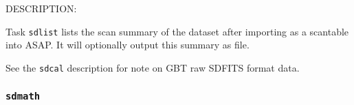 DESCRIPTION:
    
Task {\tt sdlist} lists the scan summary of the dataset after importing
as a scantable into ASAP.  It will optionally output this summary
as file.
    

See the {\tt sdcal} description for note on GBT raw SDFITS format data.

\subsubsection{{\tt sdmath}}
\label{section:sd.sdtasks.tasks.sdmath}


